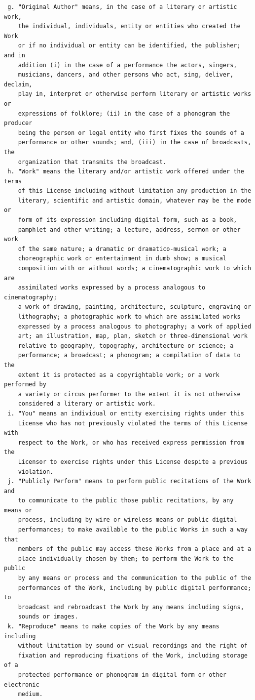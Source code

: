 \documentclass[10pt]{book}              %
\begin{document}
\begin{appendices}
\begin{verbatim}
 g. "Original Author" means, in the case of a literary or artistic work,
    the individual, individuals, entity or entities who created the Work
    or if no individual or entity can be identified, the publisher; and in
    addition (i) in the case of a performance the actors, singers,
    musicians, dancers, and other persons who act, sing, deliver, declaim,
    play in, interpret or otherwise perform literary or artistic works or
    expressions of folklore; (ii) in the case of a phonogram the producer
    being the person or legal entity who first fixes the sounds of a
    performance or other sounds; and, (iii) in the case of broadcasts, the
    organization that transmits the broadcast.
 h. "Work" means the literary and/or artistic work offered under the terms
    of this License including without limitation any production in the
    literary, scientific and artistic domain, whatever may be the mode or
    form of its expression including digital form, such as a book,
    pamphlet and other writing; a lecture, address, sermon or other work
    of the same nature; a dramatic or dramatico-musical work; a
    choreographic work or entertainment in dumb show; a musical
    composition with or without words; a cinematographic work to which are
    assimilated works expressed by a process analogous to cinematography;
    a work of drawing, painting, architecture, sculpture, engraving or
    lithography; a photographic work to which are assimilated works
    expressed by a process analogous to photography; a work of applied
    art; an illustration, map, plan, sketch or three-dimensional work
    relative to geography, topography, architecture or science; a
    performance; a broadcast; a phonogram; a compilation of data to the
    extent it is protected as a copyrightable work; or a work performed by
    a variety or circus performer to the extent it is not otherwise
    considered a literary or artistic work.
 i. "You" means an individual or entity exercising rights under this
    License who has not previously violated the terms of this License with
    respect to the Work, or who has received express permission from the
    Licensor to exercise rights under this License despite a previous
    violation.
 j. "Publicly Perform" means to perform public recitations of the Work and
    to communicate to the public those public recitations, by any means or
    process, including by wire or wireless means or public digital
    performances; to make available to the public Works in such a way that
    members of the public may access these Works from a place and at a
    place individually chosen by them; to perform the Work to the public
    by any means or process and the communication to the public of the
    performances of the Work, including by public digital performance; to
    broadcast and rebroadcast the Work by any means including signs,
    sounds or images.
 k. "Reproduce" means to make copies of the Work by any means including
    without limitation by sound or visual recordings and the right of
    fixation and reproducing fixations of the Work, including storage of a
    protected performance or phonogram in digital form or other electronic
    medium.


\end{verbatim}
\end{appendices}
\end{document}

